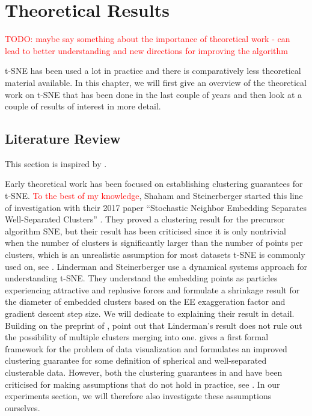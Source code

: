 \chapter{Theoretical Results}\label{chapter:theoretical_results}
\textcolor{red}{TODO: maybe say something about the importance of theoretical work - can lead to better understanding and new directions for improving the algorithm}

t-SNE has been used a lot in practice and there is comparatively less theoretical material available. 
In this chapter, we will first give an overview of the theoretical work on t-SNE that has been done in the last couple of years and then look at a couple of results of interest in more detail. 

\section{Literature Review}
This section is inspired by \cite{murray2024largedatalimitsscaling}. 

Early theoretical work has been focused on establishing clustering guarantees for t-SNE. 
\textcolor{red}{To the best of my knowledge}, Shaham and Steinerberger started this line of investigation with their 2017 paper \enquote{Stochastic Neighbor Embedding Separates Well-Separated Clusters} \cite{shaham17}. 
They proved a clustering result for the precursor algorithm SNE, but their result has been criticised since it is only nontrivial when the number of clusters is significantly larger than the number of points per clusters, which is an unrealistic assumption for most datasets t-SNE is commonly used on, see \cite{Arora18}.  
Linderman and Steinerberger \cite{LinStei22} use a dynamical systems approach for understanding t-SNE. 
They understand the embedding points as particles experiencing attractive and replusive forces and formulate a shrinkage result for the diameter of embedded clusters based on the EE exaggeration factor and gradient descent step size. 
We will dedicate  to explaining their result in detail. \\
Building on the preprint of \cite{LinStei22}, \cite{Arora18} point out that Linderman's result does not rule out the possibility of multiple clusters merging into one. 
\cite{Arora18} gives a first formal framework for the problem of data visualization and formulates an improved clustering guarantee for some definition of spherical and well-separated clusterable data. 
However, both the clustering guarantees in \cite{Arora18} and \cite{LinStei22} have been criticised for making assumptions that do not hold in practice, see \cite{yang2021tsneoptimizedrevealclusters}. 
In our experiments section, we will therefore also investigate these assumptions ourselves. 



